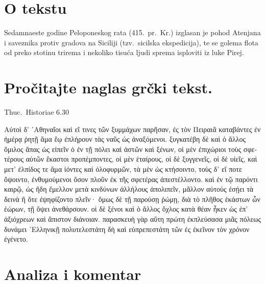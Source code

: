 


\section*{O tekstu}

Sedamnaeste godine Peloponeskog rata (415.\ pr.\ Kr.) izglasan je pohod Atenjana i saveznika protiv gradova na Siciliji (tzv.\ sicilska ekspedicija), te se golema flota od preko stotinu trirema i nekoliko tisuća ljudi sprema isploviti iz luke Pirej.


\section*{Pročitajte naglas grčki tekst.}


Thuc.\ Historiae 6.30

\medskip

{\large
\begin{greek}
\noindent Αὐτοὶ δ' ᾿Αθηναῖοι καὶ εἴ τινες τῶν ξυμμάχων παρῆσαν, ἐς τὸν Πειραιᾶ καταβάντες ἐν ἡμέρᾳ ῥητῇ ἅμα ἕῳ ἐπλήρουν τὰς ναῦς ὡς ἀναξόμενοι. ξυγκατέβη δὲ καὶ ὁ ἄλλος ὅμιλος ἅπας ὡς εἰπεῖν ὁ ἐν τῇ πόλει καὶ ἀστῶν καὶ ξένων, οἱ μὲν ἐπιχώριοι τοὺς σφετέρους αὐτῶν ἕκαστοι προπέμποντες, οἱ μὲν ἑταίρους, οἱ δὲ ξυγγενεῖς, οἱ δὲ υἱεῖς, καὶ μετ' ἐλπίδος τε ἅμα ἰόντες καὶ ὀλοφυρμῶν, τὰ μὲν ὡς κτήσοιντο, τοὺς δ' εἴ ποτε ὄψοιντο, ἐνθυμούμενοι ὅσον πλοῦν ἐκ τῆς σφετέρας ἀπεστέλλοντο. καὶ ἐν τῷ παρόντι καιρῷ, ὡς ἤδη ἔμελλον μετὰ κινδύνων ἀλλήλους ἀπολιπεῖν, μᾶλλον αὐτοὺς ἐσῄει τὰ δεινὰ ἢ ὅτε ἐψηφίζοντο πλεῖν· ὅμως δὲ τῇ παρούσῃ ῥώμῃ, διὰ τὸ πλῆθος ἑκάστων ὧν ἑώρων, τῇ ὄψει ἀνεθάρσουν. οἱ δὲ ξένοι καὶ ὁ ἄλλος ὄχλος κατὰ θέαν ἧκεν ὡς ἐπ' ἀξιόχρεων καὶ ἄπιστον διάνοιαν. παρασκευὴ γὰρ αὕτη πρώτη ἐκπλεύσασα μιᾶς πόλεως δυνάμει ῾Ελληνικῇ πολυτελεστάτη δὴ καὶ εὐπρεπεστάτη τῶν ἐς ἐκεῖνον τὸν χρόνον ἐγένετο.

\end{greek}

}

\section*{Analiza i komentar}


